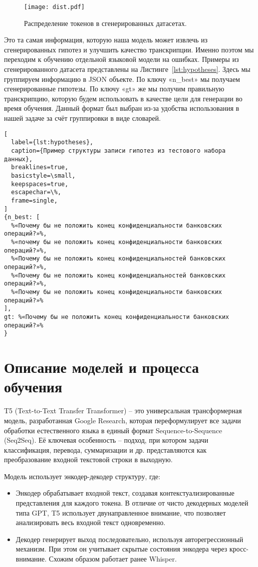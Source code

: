 \begin{figure}[!t]
  \centering
  \texttt{[image: dist.pdf]}
  \caption{Распределение токенов в сгенерированных датасетах.}
  \label{fig:dist}
\end{figure}

Это та самая информация, которую наша модель может извлечь из сгенерированных гипотез и улучшить качество транскрипции.
Именно поэтом мы переходим к обучению отдельной языковой модели на ошибках.
Примеры из сгенерированного датасета представлены на Листинге~\ref{lst:hypotheses}.
Здесь мы группируем информацию в JSON объекте.
По ключу «n\_best» мы получаем сгенерированные гипотезы.
По ключу «gt» же мы получим правильную транскрипцию, которую будем использовать в качестве цели для генерации во время обучения.
Данный формат был выбран из-за удобства использования в нашей задаче за счёт группировки в виде словарей.

\begin{lstlisting}[
  label={lst:hypotheses},
  caption={Пример структуры записи гипотез из тестового набора данных},
  breaklines=true,
  basicstyle=\small,
  keepspaces=true,
  escapechar=\%,
  frame=single,
]
{n_best: [
  %«Почему бы не положить конец конфиденциальности банковских операций?»%,
  %«почему бы не положить конец конфиденциальности банковских операций?»%,
  %«Почему бы не положить конец конфиденциальностей банковских операций?»%,
  %«Почему бы не положить конец конфиденциальностей банковских операций?»%,
  %«Почему бы не положить конец конфиденциальности банковских операций?»%
],
gt: %«Почему бы не положить конец конфиденциальности банковских операций?»%
} 
\end{lstlisting}

\section{Описание моделей и процесса обучения}

T5 (Text-to-Text Transfer Transformer)\cite{raffel2020exploring} -- это универсальная трансформерная модель, разработанная Google Research, которая переформулирует все задачи обработки естественного языка в единый формат Sequence-to-Sequence (Seq2Seq).
Её ключевая особенность -- подход, при котором задачи классификация, перевода, суммаризации и др. представляются как преобразование входной текстовой строки в выходную.

Модель использует энкодер-декодер структуру, где:
\begin{itemize}
  \item Энкодер обрабатывает входной текст, создавая контекстуализированные представления для каждого токена.
  В отличие от чисто декодерных моделей типа GPT, T5 использует двунаправленное внимание, что позволяет анализировать весь входной текст одновременно.
  \item Декодер генерирует выход последовательно, используя авторегрессионный механизм.
  При этом он учитывает скрытые состояния энкодера через кросс-внимание.
  Схожим образом работает ранее Whisper.
\end{itemize}

